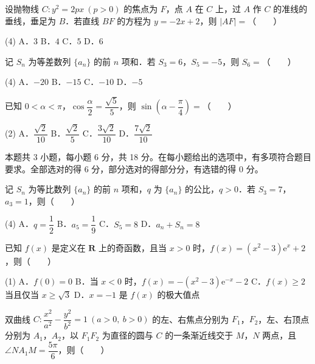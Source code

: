 设抛物线 $C:y^2=2px\ (p>0)$ 的焦点为 $F$，点 $A$ 在 $C$ 上，过 $A$ 作 $C$ 的准线的垂线，垂足为 $B$．若直线 $BF$ 的方程为 $y=-2x+2$，则 $|AF|=$（　　）

\begin{gkopts}(4)
\task A．$3$
\task B．$4$
\task C．$5$
\task D．$6$
\end{gkopts}

记 $S_n$ 为等差数列 $\{a_n\}$ 的前 $n$ 项和．若 $S_3=6$，$S_5=-5$，则 $S_6=$（　　）

\begin{gkopts}(4)
\task A．$-20$
\task B．$-15$
\task C．$-10$
\task D．$-5$
\end{gkopts}

已知 $0<\alpha<\pi$，$\cos\dfrac{\alpha}{2}=\dfrac{\sqrt5}{5}$，则 $\sin\left(\alpha-\dfrac{\pi}{4}\right)=$（　　）

\begin{gkopts}(2)
\task A．$\dfrac{\sqrt2}{10}$
\task B．$\dfrac{\sqrt2}{5}$
\task C．$\dfrac{3\sqrt2}{10}$
\task D．$\dfrac{7\sqrt2}{10}$
\end{gkopts}

\par\medskip


\begin{gktip}
本题共 3 小题，每小题 6 分，共 18 分。在每小题给出的选项中，有多项符合题目要求。全部选对的得 6 分，部分选对的得部分分，有选错的得 0 分。
\end{gktip}

记 $S_n$ 为等比数列 $\{a_n\}$ 的前 $n$ 项和，$q$ 为 $\{a_n\}$ 的公比，$q>0$．若 $S_3=7$，$a_3=1$，则（　　）

\begin{gkopts}(4)
\task A．$q=\dfrac12$
\task B．$a_5=\dfrac19$
\task C．$S_5=8$
\task D．$a_n+S_n=8$
\end{gkopts}

已知 $f(x)$ 是定义在 $\mathbf{R}$ 上的奇函数，且当 $x>0$ 时，$f(x)=\left(x^2-3\right)\mathrm{e}^{x}+2$，则（　　）

\begin{gkopts}(1)
\task A．$f(0)=0$
\task B．当 $x<0$ 时，$f(x)=-\left(x^2-3\right)\mathrm{e}^{-x}-2$
\task C．$f(x)\ge 2$ 当且仅当 $x\ge\sqrt3$
\task D．$x=-1$ 是 $f(x)$ 的极大值点
\end{gkopts}

双曲线 $C:\dfrac{x^2}{a^2}-\dfrac{y^2}{b^2}=1\ (a>0,\ b>0)$ 的左、右焦点分别为 $F_1$，$F_2$，左、右顶点分别为 $A_1$，$A_2$，以 $F_1F_2$ 为直径的圆与 $C$ 的一条渐近线交于 $M$，$N$ 两点，且 $\angle NA_1M=\dfrac{5\pi}{6}$，则（　　）

